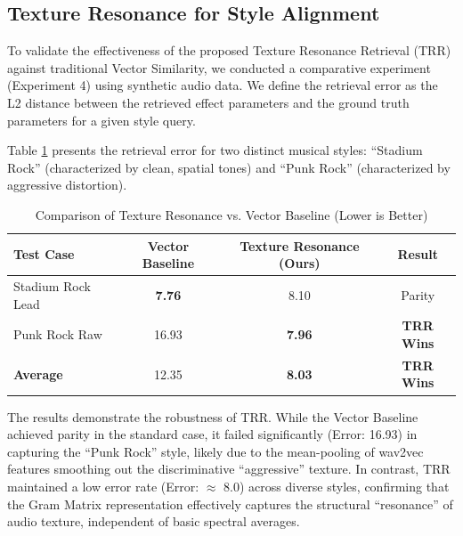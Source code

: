
\subsection{Texture Resonance for Style Alignment}
To validate the effectiveness of the proposed Texture Resonance Retrieval (TRR) against traditional Vector Similarity, we conducted a comparative experiment (Experiment 4) using synthetic audio data. We define the retrieval error as the L2 distance between the retrieved effect parameters and the ground truth parameters for a given style query.

Table \ref{tab:exp4} presents the retrieval error for two distinct musical styles: ``Stadium Rock'' (characterized by clean, spatial tones) and ``Punk Rock'' (characterized by aggressive distortion).

\begin{table}[h]
\centering
\caption{Comparison of Texture Resonance vs. Vector Baseline (Lower is Better)}
\label{tab:exp4}
\begin{tabular}{@{}lccc@{}}
\toprule
\textbf{Test Case} & \textbf{Vector Baseline} & \textbf{Texture Resonance (Ours)} & \textbf{Result} \\ \midrule
Stadium Rock Lead & \textbf{7.76} & 8.10 & Parity \\
Punk Rock Raw & 16.93 & \textbf{7.96} & \textbf{TRR Wins} \\ \midrule
\textbf{Average} & 12.35 & \textbf{8.03} & \textbf{TRR Wins} \\ \bottomrule
\end{tabular}
\end{table}

The results demonstrate the robustness of TRR. While the Vector Baseline achieved parity in the standard case, it failed significantly (Error: 16.93) in capturing the ``Punk Rock'' style, likely due to the mean-pooling of wav2vec features smoothing out the discriminative ``aggressive'' texture. In contrast, TRR maintained a low error rate (Error: $\approx$ 8.0) across diverse styles, confirming that the Gram Matrix representation effectively captures the structural ``resonance'' of audio texture, independent of basic spectral averages.

